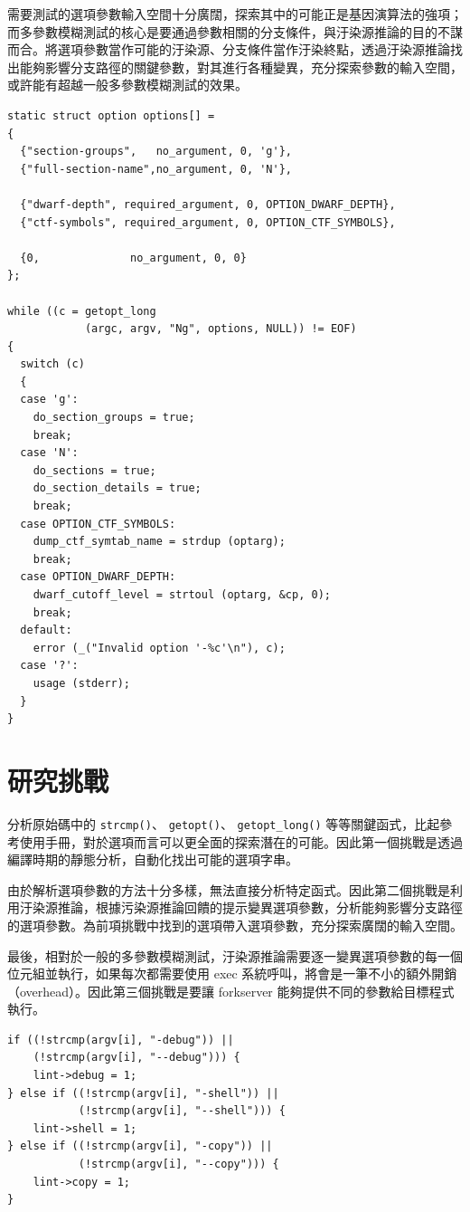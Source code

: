 需要測試的選項參數輸入空間十分廣闊，探索其中的可能正是基因演算法的強項；而多參數模糊測試的核心是要通過參數相關的分支條件，與汙染源推論的目的不謀而合。將選項參數當作可能的汙染源、分支條件當作汙染終點，透過汙染源推論找出能夠影響分支路徑的關鍵參數，對其進行各種變異，充分探索參數的輸入空間，或許能有超越一般多參數模糊測試的效果。

\newpage

\begin{lstlisting}[caption=\texttt{readelf} 參數解析（節錄）, label=lst:readelf-argparse]
static struct option options[] =
{
  {"section-groups",   no_argument, 0, 'g'},
  {"full-section-name",no_argument, 0, 'N'},

  {"dwarf-depth", required_argument, 0, OPTION_DWARF_DEPTH},
  {"ctf-symbols", required_argument, 0, OPTION_CTF_SYMBOLS},

  {0,		       no_argument, 0, 0}
};

while ((c = getopt_long
            (argc, argv, "Ng", options, NULL)) != EOF)
{
  switch (c)
  {
  case 'g':
    do_section_groups = true;
    break;
  case 'N':
    do_sections = true;
    do_section_details = true;
    break;
  case OPTION_CTF_SYMBOLS:
    dump_ctf_symtab_name = strdup (optarg);
    break;
  case OPTION_DWARF_DEPTH:
    dwarf_cutoff_level = strtoul (optarg, &cp, 0);
    break;
  default:
    error (_("Invalid option '-%c'\n"), c);
  case '?':
    usage (stderr);
  }
}
\end{lstlisting}

\section{研究挑戰}

分析原始碼中的 \texttt{strcmp()}、 \texttt{getopt()}、 \texttt{getopt\_long()} 等等關鍵函式，比起參考使用手冊，對於選項而言可以更全面的探索潛在的可能。因此第一個挑戰是透過編譯時期的靜態分析，自動化找出可能的選項字串。

由於解析選項參數的方法十分多樣，無法直接分析特定函式。因此第二個挑戰是利用汙染源推論，根據污染源推論回饋的提示變異選項參數，分析能夠影響分支路徑的選項參數。為前項挑戰中找到的選項帶入選項參數，充分探索廣闊的輸入空間。

最後，相對於一般的多參數模糊測試，汙染源推論需要逐一變異選項參數的每一個位元組並執行，如果每次都需要使用 exec 系統呼叫，將會是一筆不小的額外開銷（overhead）。因此第三個挑戰是要讓 forkserver 能夠提供不同的參數給目標程式執行。

\vfill

\begin{lstlisting}[caption=\texttt{xmllint} 參數解析（節錄）, label=lst:xmllint-argparse]
if ((!strcmp(argv[i], "-debug")) ||
    (!strcmp(argv[i], "--debug"))) {
    lint->debug = 1;
} else if ((!strcmp(argv[i], "-shell")) ||
           (!strcmp(argv[i], "--shell"))) {
    lint->shell = 1;
} else if ((!strcmp(argv[i], "-copy")) ||
           (!strcmp(argv[i], "--copy"))) {
    lint->copy = 1;
}
\end{lstlisting}
